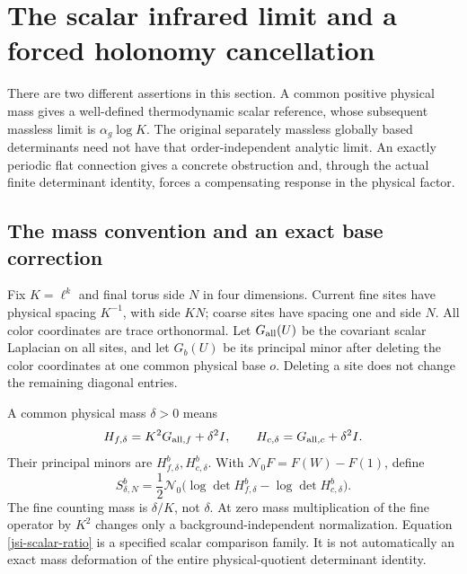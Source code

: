 \section{The scalar infrared limit and a forced holonomy cancellation}
\label{jsi-section}

There are two different assertions in this section. A common positive
physical mass gives a well-defined thermodynamic scalar reference,
whose subsequent massless limit is \(\alpha_g\log K\). The original
separately massless globally based determinants need not have that
order-independent analytic limit. An exactly periodic flat connection
gives a concrete obstruction and, through the actual finite determinant
identity, forces a compensating response in the physical factor.

\subsection{The mass convention and an exact base correction}
\label{jsi-mass-section}

Fix \(K=\ell^k\) and final torus side \(N\) in four dimensions.
Current fine sites have physical spacing \(K^{-1}\), with side \(KN\);
coarse sites have spacing one and side \(N\).
All color coordinates are trace orthonormal.
Let \(G_{\rm all}(U)\) be the covariant scalar Laplacian on all sites,
and let \(G_b(U)\) be its principal minor after deleting the color
coordinates at one common physical base \(o\). Deleting a site does
not change the remaining diagonal entries.

A common physical mass \(\delta>0\) means
\begin{equation}
 H_{f,\delta}=K^2G_{{\rm all},f}+\delta^2I,\qquad
 H_{c,\delta}=G_{{\rm all},c}+\delta^2I.
 \label{jsi-mass}
\end{equation}
Their principal minors are \(H_{f,\delta}^b,H_{c,\delta}^b\).
With \(\mathcal N_0F=F(W)-F(1)\), define
\begin{equation}
 S_{\delta,N}^b=\frac12\mathcal N_0
       \bigl(\log\det H_{f,\delta}^b-\log\det H_{c,\delta}^b\bigr).
 \label{jsi-scalar-ratio}
\end{equation}
The fine counting mass is \(\delta/K\), not \(\delta\).
At zero mass multiplication of the fine operator by \(K^2\)
changes only a background-independent normalization.
Equation \eqref{jsi-scalar-ratio} is a specified scalar comparison
family. It is not automatically an exact mass deformation of the
entire physical-quotient determinant identity.

